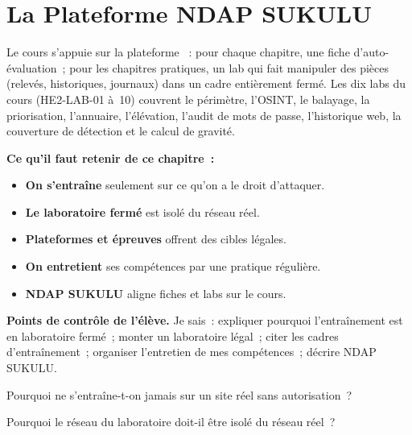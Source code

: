 \section{La Plateforme NDAP SUKULU}
\label{sec:c25-ndap}

Le cours s'appuie sur la plateforme ~: pour chaque
chapitre, une fiche d'auto-évaluation~; pour les chapitres pratiques, un lab
qui fait manipuler des pièces (relevés, historiques, journaux) dans un cadre
entièrement fermé. Les dix labs du cours (HE2-LAB-01 à~10) couvrent le
périmètre, l'OSINT, le balayage, la priorisation, l'annuaire, l'élévation,
l'audit de mots de passe, l'historique web, la couverture de détection et le
calcul de gravité.

\separateur

\begin{boxresume}
\textbf{Ce qu'il faut retenir de ce chapitre~:}
\begin{itemize}
    \item \textbf{On s'entraîne} seulement sur ce qu'on a le droit
          d'attaquer.
    \item \textbf{Le laboratoire fermé} est isolé du réseau réel.
    \item \textbf{Plateformes et épreuves} offrent des cibles légales.
    \item \textbf{On entretient} ses compétences par une pratique régulière.
    \item \textbf{NDAP SUKULU} aligne fiches et labs sur le cours.
\end{itemize}
\end{boxresume}

\begin{boxinfo}
\textbf{Points de contrôle de l'élève.} Je sais~: expliquer pourquoi
l'entraînement est en laboratoire fermé~; monter un laboratoire légal~;
citer les cadres d'entraînement~; organiser l'entretien de mes
compétences~; décrire NDAP SUKULU.
\end{boxinfo}

\bigskip

\begin{boxexo}[title={\ding{45}\quad Exercice~25.1. Légalité \niveaubase}]
Pourquoi ne s'entraîne-t-on jamais sur un site réel sans autorisation~?
\end{boxexo}

\begin{boxexo}[title={\ding{45}\quad Exercice~25.2. Isolation \niveaubase}]
Pourquoi le réseau du laboratoire doit-il être isolé du réseau réel~?
\end{boxexo}

